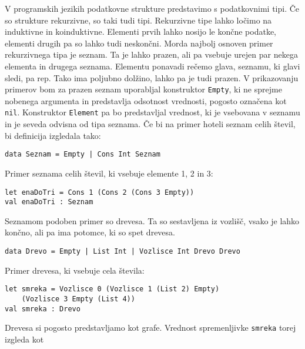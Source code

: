 \documentclass[12pt,a4paper,openany]{book}
\begin{document}
V programskih jezikih podatkovne strukture predstavimo s podatkovnimi tipi. Če so strukture rekurzivne, so taki tudi tipi. Rekurzivne tipe lahko ločimo na induktivne in koinduktivne. Elementi prvih lahko nosijo le končne podatke, elementi drugih pa so lahko tudi neskončni. 
Morda najbolj osnoven primer rekurzivnega tipa je seznam. Ta je lahko prazen, ali pa vsebuje urejen par nekega elementa in drugega seznama. Elementu ponavadi rečemo glava, seznamu, 
ki glavi sledi, pa rep. Tako ima poljubno dolžino, lahko pa je tudi prazen. V prikazovanju primerov bom za prazen seznam uporabljal konstruktor \lstinline{Empty}, ki ne sprejme nobenega argumenta in predstavlja odsotnost vrednosti, pogosto označena kot \lstinline{nil}. Konstruktor \lstinline{Element} pa bo predstavljal vrednost, ki je vsebovana v seznamu in je seveda odvisna od tipa seznama. Če bi na primer hoteli seznam celih števil, 
bi definicija izgledala tako:
\begin{lstlisting}
data Seznam = Empty | Cons Int Seznam
\end{lstlisting}
Primer seznama celih števil, ki vsebuje elemente 1, 2 in 3:
\begin{lstlisting}
let enaDoTri = Cons 1 (Cons 2 (Cons 3 Empty))
val enaDoTri : Seznam
\end{lstlisting}

Seznamom podoben primer so drevesa. Ta so sestavljena iz vozlišč, vsako je lahko končno, ali pa ima potomce, ki so spet drevesa.
\begin{lstlisting}
data Drevo = Empty | List Int | Vozlisce Int Drevo Drevo
\end{lstlisting}
Primer drevesa, ki vsebuje cela števila:
\begin{lstlisting}
let smreka = Vozlisce 0 (Vozlisce 1 (List 2) Empty)
    (Vozlisce 3 Empty (List 4))
val smreka : Drevo
\end{lstlisting}
Drevesa si pogosto predstavljamo kot grafe. Vrednost spremenljivke \lstinline{smreka} torej izgleda kot
\begin{center} 
\end{center}
\end{document}
